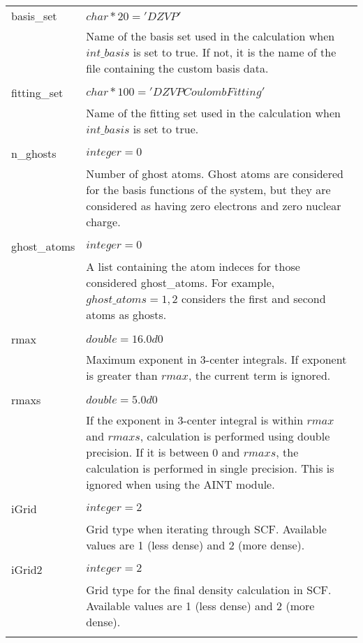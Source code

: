 \begin{Spacing}{1.0}
\begin{longtable}{ p{} p{} }
      basis\_set & $ char*20 = 'DZVP' $ \\
      & Name of the basis set used in the calculation when $int\_basis$ is set
      to true. If not, it is the name of the file containing the custom basis
      data. \\
      \\
   
      fitting\_set & $ char*100 = 'DZVP Coulomb Fitting' $ \\
      & Name of the fitting set used in the calculation when $int\_basis$ is
      set to true.\\
      \\   
   
      n\_ghosts & $ integer = 0 $ \\
      & Number of ghost atoms. Ghost atoms are considered for the basis functions
      of the system, but they are considered as having zero electrons and zero
      nuclear charge. \\
      \\
   
      ghost\_atoms & $ integer = 0 $ \\
      & A list containing the atom indeces for those considered ghost\_atoms. 
      For example, $ghost\_atoms = 1,2 $ considers the first and second atoms
      as ghosts. \\
      \\
   
      rmax & $ double = 16.0d0 $ \\
      & Maximum exponent in 3-center integrals. If exponent
      is greater than $rmax$, the current term is ignored. \\
      \\

      rmaxs & $ double = 5.0d0 $ \\
      & If the exponent in 3-center integral is within
      $rmax$ and $rmaxs$, calculation is performed using
      double precision. If it is between 0 and $rmaxs$, 
      the calculation is performed in single precision.
      This is ignored when using the AINT module. \\
      \\
   
      iGrid & $ integer = 2 $ \\
      & Grid type when iterating through SCF. Available 
      values are 1 (less dense) and 2 (more dense).\\
      \\
   
      iGrid2 & $ integer = 2 $ \\
      & Grid type for the final density calculation in
      SCF. Available values are 1 (less dense) and 2
      (more dense).\\
      \\
   \end{longtable}
   \end{Spacing}

